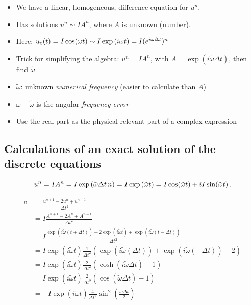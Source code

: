\documentclass[%
oneside,                 %
final,                   %
10pt]{article}
\begin{document}
\begin{itemize}
  \item We have a linear, homogeneous, difference equation for $u^n$.

  \item Has solutions $u^n \sim IA^n$, where $A$ is unknown (number).

  \item Here: $\uex(t) =I\cos(\omega t) \sim I\exp{(i\omega t)} = I(e^{i\omega\Delta t})^n$

  \item Trick for simplifying the algebra: $u^n = IA^n$, with $A=\exp{(i\tilde\omega\Delta t)}$, then find $\tilde\omega$

  \item $\tilde\omega$: unknown \emph{numerical frequency} (easier to calculate than $A$)

  \item $\omega - \tilde\omega$ is the angular \emph{frequency error}

  \item Use the real part as the physical relevant part of a complex expression
\end{itemize}

\noindent
\subsection*{Calculations of an exact solution of the discrete equations}

\[
u^n = IA^n = I\exp{(\tilde\omega \Delta t\, n)}=I\exp{(\tilde\omega t)} =
I\cos (\tilde\omega t) + iI\sin(\tilde \omega t)
\tp
\]

\begin{align*}
[D_tD_t u]^n &= \frac{u^{n+1} - 2u^n + u^{n-1}}{\Delta t^2}\\ 
&= I\frac{A^{n+1} - 2A^n + A^{n-1}}{\Delta t^2}\\ 
&= I\frac{\exp{(i\tilde\omega(t+\Delta t))} - 2\exp{(i\tilde\omega t)} + \exp{(i\tilde\omega(t-\Delta t))}}{\Delta t^2}\\ 
&= I\exp{(i\tilde\omega t)}\frac{1}{\Delta t^2}\left(\exp{(i\tilde\omega(\Delta t))} + \exp{(i\tilde\omega(-\Delta t))} - 2\right)\\ 
&= I\exp{(i\tilde\omega t)}\frac{2}{\Delta t^2}\left(\cosh(i\tilde\omega\Delta t) -1 \right)\\ 
&= I\exp{(i\tilde\omega t)}\frac{2}{\Delta t^2}\left(\cos(\tilde\omega\Delta t) -1 \right)\\ 
&= -I\exp{(i\tilde\omega t)}\frac{4}{\Delta t^2}\sin^2(\frac{\tilde\omega\Delta t}{2})
\end{align*}
\end{document}
